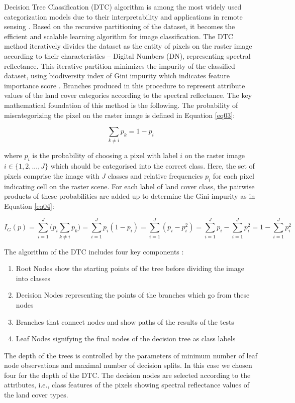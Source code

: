 \documentclass[sn-mathphys-num]{sn-jnl}%
\theoremstyle{thmstyleone}%
\theoremstyle{thmstyletwo}%
\theoremstyle{thmstylethree}%
\begin{document}
{Decision Tree Classification (DTC) algorithm is among the most widely used categorization models due to their interpretability and applications in remote sensing} \cite{Miao,Buthelezi,Meyer}. {Based on the recursive partitioning of the dataset, it becomes the efficient and scalable learning algorithm for image classification. The DTC method iteratively divides the dataset as the entity of pixels on the raster image according to their characteristics -- Digital Numbers (DN), representing spectral reflectance. This iterative partition minimizes the impurity of the classified dataset, using biodiversity index of Gini impurity which indicates feature importance score} \cite{rs16101659}. {Branches produced in this procedure to represent attribute values of the land cover categories according to the spectral reflectance. The key mathematical foundation of this method is the following. The probability of miscategorizing the pixel on the raster image is defined in Equation }\ref{eq03}:

\begin{equation}\label{eq03}
	\sum_{k\neq{i}} p_{k} = 1 - p_{i}
\end{equation}

{where $p_i$ is the probability of choosing a pixel with label $i$ on the raster image $ i\in \{1,2,...,J\}$ which should be categorised into the correct class. Here, the set of pixels comprise the image with $J$ classes and relative frequencies $p_{i}$ for each pixel indicating cell on the raster scene. For each label of land cover class, the pairwise products of these probabilities are added up to determine the Gini impurity as in Equation }\ref{eq04}:

 \begin{equation}\label{eq04}
	I_{G}(p)=\sum_{i=1}^{J}\Biggl(p_i\sum_{k\neq{i}} p_k\Biggr) = \sum_{i=1}^{J} p_i(1-p_i) = \sum_{i=1}^{J} (p_i - p_{i}^2) = \sum_{i=1}^{J} p_i - \sum_{i=1}^{J} p_{i}^2 = 1 - \sum_{i=1}^{J} p_{i}^2
\end{equation}

{The algorithm of the DTC includes four key components :} 
\begin{enumerate}
	\item {Root Nodes show the starting points of the tree before dividing the image into classes} 
	\item {Decision Nodes representing the points of the branches which go from these nodes}
	\item {Branches that connect nodes and show paths  of the results of the tests}
	\item {Leaf Nodes signifying the final nodes of the decision tree as class labels}
\end{enumerate}
{The depth of the trees is controlled by the parameters of minimum number of leaf node observations and maximal number of decision splits. In this case we chosen four for the depth of the DTC. The decision nodes are selected according to the attributes, i.e., class features of the pixels showing spectral reflectance values of the land cover types.}
\end{document}
